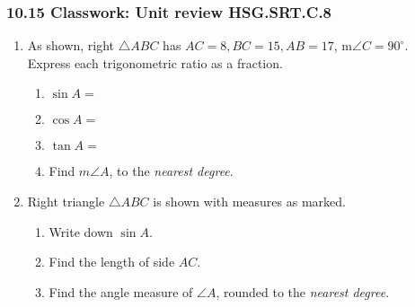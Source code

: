 \documentclass[12pt, twoside]{article}
\begin{document}
\subsubsection*{10.15 Classwork: Unit review \hfill HSG.SRT.C.8}
\begin{enumerate}
\item As shown, right $\triangle ABC$ has $AC=8, BC=15, AB=17$, m$\angle C=90^\circ$. \\[0.25cm] 
Express each trigonometric ratio as a fraction.
  \begin{multicols}{2}
    \begin{enumerate}[itemsep=0cm]
      \item $\sin A =$
      \item $\cos A =$
      \item $\tan A =$
      \item Find $m\angle A$, to the \emph{nearest degree}.
    \end{enumerate}
    \begin{center}
    \end{center}
  \end{multicols} \vspace{1cm}

\item Right triangle $\triangle ABC$ is shown with measures as marked.\vspace{0.25cm}
\begin{multicols}{2}
  \begin{enumerate}[itemsep=0.5cm]
    \item Write down $\sin A$.
    \item Find the length of side $AC$.\vspace{1.5cm}
    \item Find the angle measure of $\angle A$, rounded to the \emph{nearest degree}.
    \vspace{1cm}
  \end{enumerate}
\begin{flushright}
\end{flushright}
\end{multicols} \vspace{1cm}



\end{enumerate}
\end{document}

